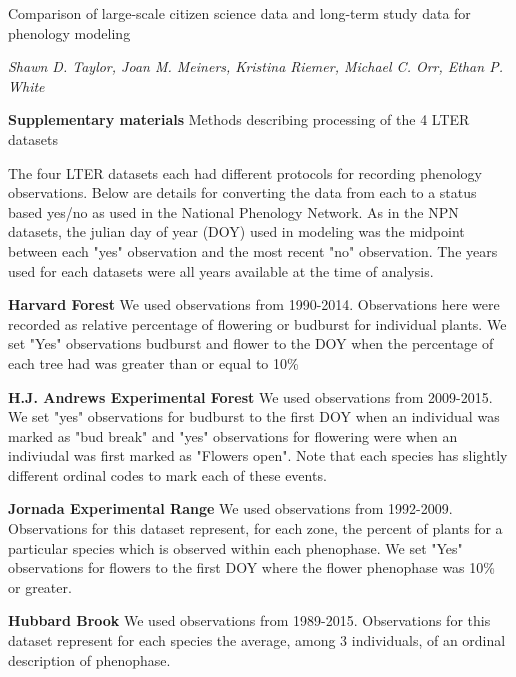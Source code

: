 \documentclass[a4paper,12pt]{article}
\begin{document}
{\Large Comparison of large-scale citizen science data and long-term study data for phenology modeling \par} \newline

\textit{Shawn D. Taylor, Joan M. Meiners, Kristina Riemer, Michael C. Orr, Ethan P. White} \newline

{\Large \textbf{Supplementary materials}} \newline
Methods describing processing of the 4 LTER datasets

The four LTER datasets each had different protocols for recording phenology observations. Below are details for converting the data from each to a status based yes/no as used in the National Phenology Network. As in the NPN datasets, the julian day of year (DOY) used in modeling was the midpoint between each "yes" observation and the most recent "no" observation. The years used for each datasets were all years available at the time of analysis. 

\textbf{Harvard Forest} \newline
We used observations from 1990-2014. Observations here were recorded as relative percentage of flowering or budburst for individual plants. We set "Yes" observations budburst and flower to the DOY when the percentage of each tree had was greater than or equal to 10\%

\textbf{H.J. Andrews Experimental Forest} \newline
We used observations from 2009-2015. We set "yes" observations for budburst to the first DOY when an individual was marked as "bud break" and "yes" observations for flowering were when an indiviudal was first marked as "Flowers open". Note that each species has slightly different ordinal codes to mark each of these events. 

\textbf{Jornada Experimental Range} \newline
We used observations from 1992-2009. Observations for this dataset represent, for each zone, the percent of plants for a particular species which is observed within each phenophase. We set "Yes" observations for flowers to the first DOY where the flower phenophase was 10\% or greater.

\textbf{Hubbard Brook} \newline
We used observations from 1989-2015. Observations for this dataset represent for each species the average, among 3 individuals, of an ordinal description of phenophase. \newline
\end{document}
